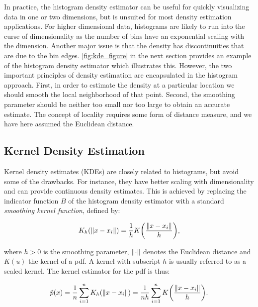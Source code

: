 In practice, the histogram density estimator can be useful for quickly visualizing data in one or two dimensions, but is unsuited for most density estimation applications. For higher dimensional data, histograms are likely to run into the curse of dimensionality as the number of bins have an exponential scaling with the dimension. Another major issue is that the density has discontinuities that are due to the bin edges. \autoref{fig:kde_figure} in the next section provides an example of the histogram density estimator which illustrates this. However, the two important principles of density estimation are encapsulated in the histogram approach. First, in order to estimate the density at a particular location we should smooth the local neighborhood of that point. Second, the smoothing parameter should be neither too small nor too large to obtain an accurate estimate. The concept of locality requires some form of distance measure, and we have here assumed the Euclidean distance.

\subsection{Kernel Density Estimation}\label{sec:kde}

Kernel density estimates (KDEs) are closely related to histograms, but avoid some of the drawbacks. For instance, they have better scaling with dimensionality and can provide continuous density estimates. This is achieved by replacing the indicator function $B$ of the histogram density estimator with a standard \textit{smoothing kernel function}, defined by: 

\begin{equation}\label{eq:kernel_smooth_func}
    K_h \qty(\norm{x - x_i}) = \frac{1}{h} K \qty(\frac{\norm{x - x_i}}{h}),  
\end{equation}

where $h>0$ is the smoothing parameter, $\norm{\cdot}$ denotes the Euclidean distance  and $K(u)$ the kernel of a pdf. A kernel with subscript $h$ is usually referred to as a scaled kernel. The kernel estimator for the pdf is thus: 

\begin{equation}\label{eq:kde}
    \hat{p}(x) = \frac{1}{n} \sum_{i=1}^n K_h \qty(\norm{x - x_i}) = \frac{1}{nh} \sum_{i=1}^n K \qty(\frac{\norm{x - x_i}}{h}).
\end{equation}

